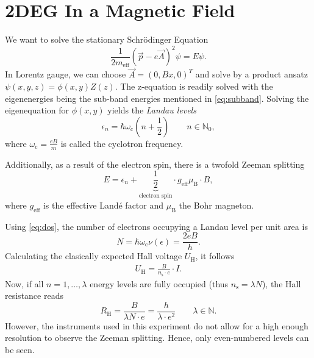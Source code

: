 \section{2DEG In a Magnetic Field}\label{sec:mag_2deg}
We want to solve the stationary Schrödinger Equation
\begin{equation*}
	\frac{1}{2m_\text{eff}}\left(\vec{p}-e\vec{A}\right)^2\psi = E\psi.
\end{equation*}
In Lorentz gauge, we can choose $\vec{A}=(0, Bx, 0)^T$ and solve by a product ansatz $\psi(x,y,z) = \phi(x,y)Z(z)$.
The z-equation is readily solved with the eigenenergies being the sub-band energies mentioned in \autoref{eq:subband}.
Solving the eigenequation for $\phi(x,y)$ yields the \textit{Landau levels}
\begin{equation*}
	\epsilon_n = \hbar\omega_\text{c}\left(n+\frac{1}{2}\right)\qquad{n\in\mathbb{N}_0},
\end{equation*}
where $\omega_\text{c} = \frac{eB}{m}$ is called the cyclotron frequency.

Additionally, as a result of the electron spin, there is a twofold Zeeman splitting
\begin{equation*}
	E = \epsilon_n + \underbrace{\frac{1}{2}}_\text{electron spin}\cdot g_\text{eff}\mu_\text{B}\cdot B,
\end{equation*}
where $g_\text{eff}$ is the effective Landé factor and $\mu_\text{B}$ the Bohr magneton.

Using \autoref{eq:dos}, the number of electrons occupying a Landau level per unit area is
\begin{equation*}
	N = \hbar\omega_\text{c}\nu(\epsilon) = \frac{2eB}{h}.
\end{equation*}
Calculating the clasically expected Hall voltage $U_\text{H}$, it follows
\begin{align*}
	U_\text{H} = \frac{B}{n_\text{s}\cdot e}\cdot I.
\end{align*}
Now, if all $n=1,\dots,\lambda$ energy levels are fully occupied (thus $n_\text{s}=\lambda N$), the Hall resistance reads
\begin{equation*}
	R_\text{H} = \frac{B}{\lambda N\cdot e} = \frac{h}{\lambda\cdot e^2}\qquad \lambda\in\mathbb{N}.
\end{equation*}
However, the instruments used in this experiment do not allow for a high enough resolution to observe the Zeeman splitting.
Hence, only even-numbered levels can be seen.

